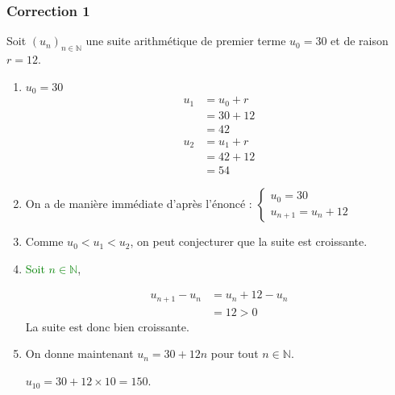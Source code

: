 \documentclass[15pt, mathserif]{beamer}
\newcommand{\N}{\mathbb{N}}			%
\newcommand{\st}[1]{$(#1_n)_{n \in \N}$}
\begin{document}
\begin{frame}
\vspace{-10mm}
	\frametitle{Correction 1}
Soit \st{u} une suite arithmétique de premier terme $u_0=30$ et de raison $r=12$. 
 
 \begin{enumerate} 
 	 \item \begin{multicols}{3} 
 
 $u_0=30$ 
 \columnbreak 
 \begin{align*} 
 u_1 &= u_0+r \\ 
 &= 30+12\\ 
 &= 42 
 \end{align*}  
 \columnbreak 
 \begin{align*} 
 u_2 &= u_1+r \\ 
 &= 42+12\\ 
 &= 54 
 \end{align*} 
 \end{multicols} 
 \vfil 
 	 \item On a de manière immédiate d'après l'énoncé : 
 \hfil$\begin{cases} 
 u_0=30 \\ 
 u_{n+1}=u_n+12 
 \end{cases}$ 
 \vfil 
 	 \item Comme $u_0<u_1<u_2$, on peut conjecturer que la suite est croissante.
 \end{enumerate} 
 
 \end{frame} 
 
 \begin{frame}  
 \begin{enumerate} \setcounter{enumi}{3} 
 	 \item \textcolor{green}{Soit $n \in \N$}, 
 
  \begin{align*} 
 u_{n+1}-u_n &= u_n +12-u_n \\ 
 &= 12>0 
 \end{align*}La suite est donc bien croissante.
 \vfil 
 	 \item  On donne maintenant $u_n=30+12n$ pour tout $n \in \N$. 
 
  \hfil$u_{10}=30+12\times 10=150$. 
 
 \end{enumerate} \end{frame}
\end{document}
